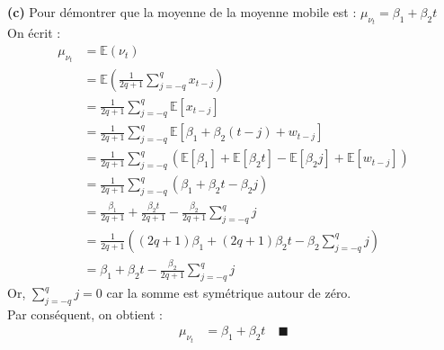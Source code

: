 \documentclass{homework}
\begin{document}
\textbf{(c)} Pour démontrer que la moyenne de la moyenne mobile est : $\mu_{\nu_t} = \beta_1 + \beta_2t$ \\
On écrit :
\begin{align*}
\mu_{\nu_t} &= \mathbb{E}(\nu_t) \\
             &= \mathbb{E}\left(\frac{1}{2q + 1}\sum_{j=-q}^{q}x_{t-j}\right) \\
             &= \frac{1}{2q + 1}\sum_{j=-q}^{q}\mathbb{E}[x_{t-j}] \\
             &= \frac{1}{2q + 1}\sum_{j=-q}^{q}\mathbb{E}[\beta_1 + \beta_2(t-j) + w_{t-j}] \\
             &= \frac{1}{2q + 1}\sum_{j=-q}^{q}(\mathbb{E}[\beta_1] + \mathbb{E}[\beta_2 t] - \mathbb{E}[\beta_2 j] + \mathbb{E}[w_{t-j}]) \\
             &= \frac{1}{2q + 1}\sum_{j=-q}^{q}(\beta_1 + \beta_2 t - \beta_2 j) \\
             &= \frac{\beta_1}{2q + 1} + \frac{\beta_2t}{2q + 1} - \frac{\beta_2}{2q + 1}\sum_{j=-q}^{q}j \\
             &= \frac{1}{2q + 1}\left((2q+1)\beta_1 + (2q+1)\beta_2 t - \beta_2\sum_{j=-q}^{q}j\right) \\
             &= \beta_1 + \beta_2t - \frac{\beta_2}{2q+1}\sum_{j=-q}^{q}j
\end{align*}
Or, $\sum_{j=-q}^{q}j = 0$ car la somme est symétrique autour de zéro.\\
Par conséquent, on obtient :
\begin{align*}
\mu_{\nu_t} &= \beta_1 + \beta_2t \quad  \blacksquare
\end{align*}
\end{document}
